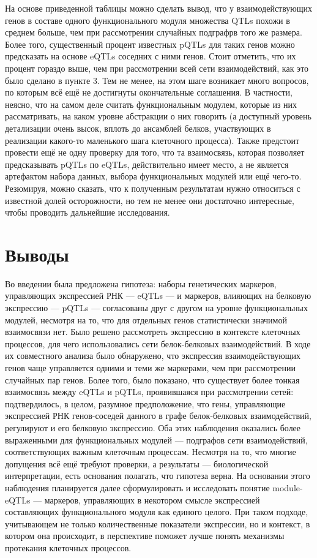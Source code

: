 \documentclass[11pt,a4paper]{report}
\theoremstyle{definition}
\theoremstyle{definition}
\theoremstyle{definition}
\begin{document}
	На основе приведенной таблицы можно сделать вывод, что у взаимодействующих генов в составе одного функционального модуля множества QTLs похожи в среднем больше, чем при рассмотрении случайных подграфрв того же размера. Более того, существенный процент известных pQTLs для таких генов можно предсказать на основе eQTLs соседних с ними генов. Стоит отметить, что их процент гораздо выше, чем при рассмотрении всей сети взаимодействий, как это было сделано в пункте 3. Тем не менее, на этом шаге возникает много вопросов, по которым всё ещё не достигнуты окончательные соглашения. В частности, неясно, что на самом деле считать функциональным модулем, которые из них рассматривать, на каком уровне абстракции о них говорить (а доступный уровень детализации очень высок, вплоть до ансамблей белков, участвующих в реализации какого-то маленького шага клеточного процесса). Также предстоит провести ещё не одну проверку для того, что та взаимосвязь, которая позволяет предсказывать pQTLs по eQTLs, действительно имеет место, а не является артефактом набора данных, выбора функциональных модулей или ещё чего-то. Резюмируя, можно сказать, что к полученным результатам нужно относиться с известной долей осторожности, но тем не менее они достаточно интересные, чтобы проводить дальнейшие исследования.
	
	\section{Выводы}
	
	Во введении была предложена гипотеза: наборы генетических маркеров, управляющих экспрессией РНК — eQTLs — и маркеров, влияющих на белковую экспрессию — pQTLs — согласованы друг с другом на уровне функциональных модулей, несмотря на то, что для отдельных генов статистически значимой взаимосвязи нет. Было решено рассмотреть экспрессию в контексте клеточных процессов, для чего использовались сети белок-белковых взаимодействий. В ходе их совместного анализа было обнаружено, что экспрессия взаимодействующих генов чаще управляется одними и теми же маркерами, чем при рассмотрении случайных пар генов. Более того, было показано, что существует более тонкая взаимосвязь между eQTLs и pQTLs, проявившаяся при рассмотрении сетей: подтвердилось, в целом, разумное предположение, что гены, управляющие экспрессией РНК генов-соседей данного в графе белок-белковых взаимодействий, регулируют и его белковую экспрессию. Оба этих наблюдения оказались более выраженными для функциональных модулей — подграфов сети взаимодействий, соответствующих важным клеточным процессам. Несмотря на то, что многие допущения всё ещё требуют проверки, а результаты ­— биологической интерпретации, есть основания полагать, что гипотеза верна. На основании этого наблюдения планируется далее сформулировать и исследовать понятие module-eQTLs — маркеров, управляющих в некотором смысле экспрессией составляющих функционального модуля как единого целого. При таком подходе, учитывающем не только количественные показатели экспрессии, но и контекст, в котором она происходит, в перспективе поможет лучше понять механизмы протекания клеточных процессов.
	
\end{document}
